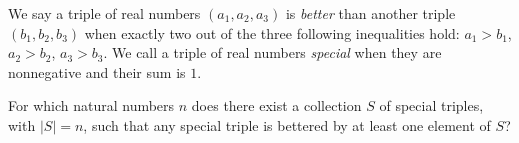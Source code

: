 We say a triple of real numbers $ (a_1,a_2,a_3)$ is \textit{better} than another triple $ (b_1,b_2,b_3)$ when exactly two out of the three following inequalities hold: $ a_1 > b_1$, $ a_2 > b_2$, $ a_3 > b_3$. We call a triple of real numbers \textit{special} when they are nonnegative and their sum is $ 1$.

For which natural numbers $ n$ does there exist a collection $ S$ of special triples, with $ |S| = n$, such that any special triple is bettered by at least one element of $ S$?